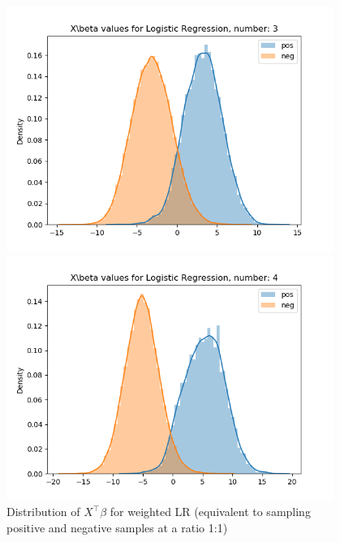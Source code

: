 \documentclass{article}
\begin{document}
\begin{figure}[H]
\begin{minipage}{0.19\textwidth}
    \end{minipage}
    \begin{minipage}{0.19\textwidth}
        \centering
        \includegraphics[width=0.95\textwidth]{fig/lr/3_weighted.png}
    \end{minipage}
    \begin{minipage}{0.19\textwidth}
        \centering
        \includegraphics[width=0.95\textwidth]{fig/lr/4_weighted.png}
    \end{minipage}
    \caption{Distribution of $X^\top\beta$ for weighted LR (equivalent to sampling positive and negative samples at a ratio 1:1)}
\end{figure}
\end{document}
